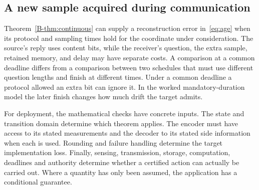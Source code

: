 \subsection{A new sample acquired during communication}
Theorem~\ref{B-thm:continuous} can supply a reconstruction error in~\eqref{eq:age} when its protocol and sampling times hold for the coordinate under consideration. The source's reply uses content bits, while the receiver's question, the extra sample, retained memory, and delay may have separate costs. A comparison at a common deadline differs from a comparison between two schedules that must use different question lengths and finish at different times. Under a common deadline a protocol allowed an extra bit can ignore it. In the worked mandatory-duration model the later finish changes how much drift the target admits.

For deployment, the mathematical checks have concrete inputs. The state and transition domain determine which theorem applies. The encoder must have access to its stated measurements and the decoder to its stated side information when each is used. Rounding and failure handling determine the target implementation loss. Finally, sensing, transmission, storage, computation, deadlines and authority determine whether a certified action can actually be carried out. Where a quantity has only been assumed, the application has a conditional guarantee.
